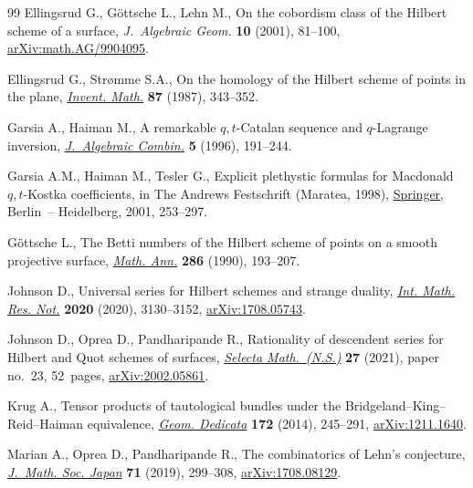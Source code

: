 \documentclass[pdftex]{sigma}
\numberwithin{equation}{section}
\begin{document}
\begin{thebibliography}{99}
Ellingsrud G., G\"ottsche L., Lehn M., On the cobordism class of the {H}ilbert
 scheme of a surface, \textit{J.~Algebraic Geom.} \textbf{10} (2001), 81--100,
 \href{https://arxiv.org/abs/math.AG/9904095}{arXiv:math.AG/9904095}.

Ellingsrud G., Str{\o}mme S.A., On the homology of the {H}ilbert scheme of
 points in the plane, \href{https://doi.org/10.1007/BF01389419}{\textit{Invent. Math.}} \textbf{87} (1987), 343--352.

Garsia A., Haiman M., A remarkable {$q,t$}-Catalan sequence and {$q$}-Lagrange
 inversion, \href{https://doi.org/10.1023/A:1022476211638}{\textit{J.~Algebraic Combin.}} \textbf{5} (1996), 191--244.

Garsia A.M., Haiman M., Tesler G., Explicit plethystic formulas for {M}acdonald
 {$q,t$}-{K}ostka coefficients, in The Andrews Festschrift (Maratea, 1998),
 \href{https://doi.org/10.1007/978-3-642-56513-7_13}{Springer}, Berlin~-- Heidelberg, 2001, 253--297.

G\"ottsche L., The {B}etti numbers of the {H}ilbert scheme of points on a
 smooth projective surface, \href{https://doi.org/10.1007/BF01453572}{\textit{Math. Ann.}} \textbf{286} (1990), 193--207.

Johnson D., Universal series for {H}ilbert schemes and strange duality,
 \href{https://doi.org/10.1093/imrn/rny101}{\textit{Int. Math. Res. Not.}} \textbf{2020} (2020), 3130--3152,
 \href{https://arxiv.org/abs/1708.05743}{arXiv:1708.05743}.

Johnson D., Oprea D., Pandharipande R., Rationality of descendent series for
 {H}ilbert and {Q}uot schemes of surfaces, \href{https://doi.org/10.1007/s00029-021-00638-1}{\textit{Selecta Math.~(N.S.)}}
 \textbf{27} (2021), paper no.~23, 52~pages, \href{https://arxiv.org/abs/2002.05861}{arXiv:2002.05861}.

Krug A., Tensor products of tautological bundles under the
 {B}ridgeland--{K}ing--{R}eid--{H}aiman equivalence, \href{https://doi.org/10.1007/s10711-013-9919-1}{\textit{Geom. Dedicata}}
 \textbf{172} (2014), 245--291, \href{https://arxiv.org/abs/1211.1640}{arXiv:1211.1640}.

Marian A., Oprea D., Pandharipande R., The combinatorics of {L}ehn's
 conjecture, \href{https://doi.org/10.2969/jmsj/78747874}{\textit{J.~Math. Soc. Japan}} \textbf{71} (2019), 299--308,
 \href{https://arxiv.org/abs/1708.08129}{arXiv:1708.08129}.


\end{thebibliography}
\end{document}

